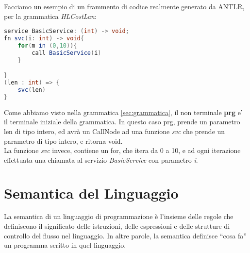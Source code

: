 \documentclass[../../main.tex]{subfiles}
\begin{document}
Facciamo un esempio di un frammento di codice realmente generato da ANTLR, per la grammatica \textit{HLCostLan}:
\begin{lstlisting}[language=Java, caption={Esempio di codice HLCostLan: example/Listing6}, label={lst:example_code}]
service BasicService: (int) -> void;
fn svc(i: int) -> void{
    for(m in (0,10)){
        call BasicService(i)
    }

}
(len : int) => {
	svc(len)
}
\end{lstlisting}

Come abbiamo visto nella grammatica \ref{sec:grammatica}, il non terminale \textbf{prg} e' il terminale iniziale della grammatica. In questo caso prg, prende un parametro len di tipo intero, ed avrà un CallNode ad una funzione \textit{svc} che prende un parametro di tipo intero, e ritorna void.\\
La funzione \textit{svc} invece, contiene un for, che itera da 0 a 10, e ad ogni iterazione effettuata una chiamata al servizio \textit{BasicService} con parametro \textit{i}.\\

\section{Semantica del Linguaggio}\label{sec:semantica}
La semantica di un linguaggio di programmazione è l'insieme delle regole che definiscono il significato delle istruzioni, delle espressioni e delle strutture di controllo del flusso nel linguaggio. In altre parole, la semantica definisce ``cosa fa'' un programma scritto in quel linguaggio.
\end{document}
